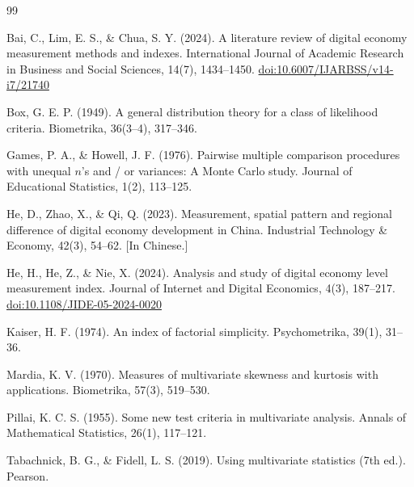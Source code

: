 \documentclass[12pt,letterpaper]{article}
\begin{document}
\begin{thebibliography}{99}
\setlength{\itemsep}{0.4em}\small

Bai, C., Lim, E. S., \& Chua, S. Y. (2024). A literature review of digital
economy measurement methods and indexes. {International Journal of Academic
Research in Business and Social Sciences}, 14(7), 1434--1450.
\href{https://doi.org/10.6007/IJARBSS/v14-i7/21740}{doi:10.6007/IJARBSS/v14-i7/21740}

Box, G. E. P. (1949). A general distribution theory for a class of likelihood
criteria. {Biometrika}, 36(3--4), 317--346.

Games, P. A., \& Howell, J. F. (1976). Pairwise multiple comparison procedures
with unequal $n$'s and / or variances: A Monte Carlo study. {Journal of
Educational Statistics}, 1(2), 113--125.

He, D., Zhao, X., \& Qi, Q. (2023). Measurement, spatial pattern and regional
difference of digital economy development in China. {Industrial Technology
\& Economy}, 42(3), 54--62. [In Chinese.]

He, H., He, Z., \& Nie, X. (2024). Analysis and study of digital economy level
measurement index. {Journal of Internet and Digital Economics}, 4(3),
187--217.
\href{https://doi.org/10.1108/JIDE-05-2024-0020}{doi:10.1108/JIDE-05-2024-0020}

Kaiser, H. F. (1974). An index of factorial simplicity. {Psychometrika},
39(1), 31--36.

Mardia, K. V. (1970). Measures of multivariate skewness and kurtosis with
applications. {Biometrika}, 57(3), 519--530.

Pillai, K. C. S. (1955). Some new test criteria in multivariate analysis.
{Annals of Mathematical Statistics}, 26(1), 117--121.

Tabachnick, B. G., \& Fidell, L. S. (2019). {Using multivariate statistics}
(7th ed.). Pearson.

\end{thebibliography}
\end{document}
